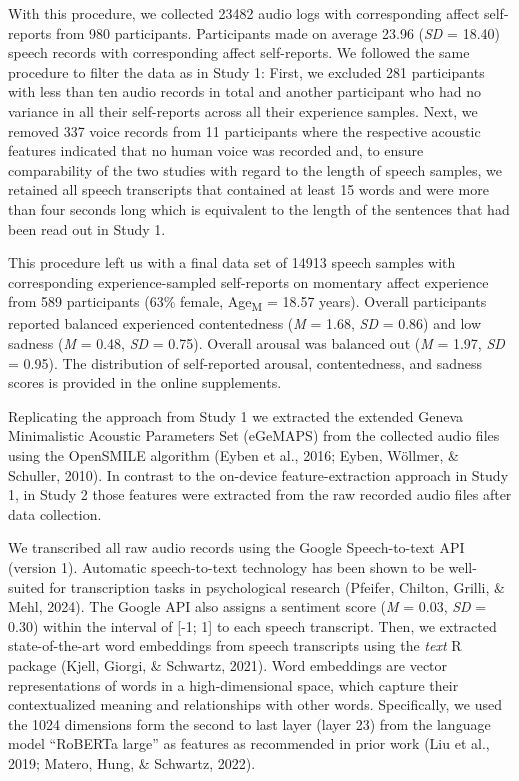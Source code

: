 \documentclass[
  english,
  man,floatsintext]{apa6}
\begin{document}
With this procedure, we collected 23482 audio logs with corresponding affect self-reports from 980 participants. Participants made on average 23.96 (\emph{SD} = 18.40) speech records with corresponding affect self-reports. We followed the same procedure to filter the data as in Study 1: First, we excluded 281 participants with less than ten audio records in total and another participant who had no variance in all their self-reports across all their experience samples. Next, we removed 337 voice records from 11 participants where the respective acoustic features indicated that no human voice was recorded and, to ensure comparability of the two studies with regard to the length of speech samples, we retained all speech transcripts that contained at least 15 words and were more than four seconds long which is equivalent to the length of the sentences that had been read out in Study 1.

This procedure left us with a final data set of 14913 speech samples with corresponding experience-sampled self-reports on momentary affect experience from 589 participants (63\% female, Age\textsubscript{M} = 18.57 years). Overall participants reported balanced experienced contentedness (\emph{M} = 1.68, \emph{SD} = 0.86) and low sadness (\emph{M} = 0.48, \emph{SD} = 0.75). Overall arousal was balanced out (\emph{M} = 1.97, \emph{SD} = 0.95). The distribution of self-reported arousal, contentedness, and sadness scores is provided in the online supplements.

Replicating the approach from Study 1 we extracted the extended Geneva Minimalistic Acoustic Parameters Set (eGeMAPS) from the collected audio files using the OpenSMILE algorithm (Eyben et al., 2016; Eyben, Wöllmer, \& Schuller, 2010). In contrast to the on-device feature-extraction approach in Study 1, in Study 2 those features were extracted from the raw recorded audio files after data collection.

We transcribed all raw audio records using the Google Speech-to-text API (version 1). Automatic speech-to-text technology has been shown to be well-suited for transcription tasks in psychological research (Pfeifer, Chilton, Grilli, \& Mehl, 2024). The Google API also assigns a sentiment score (\emph{M} = 0.03, \emph{SD} = 0.30) within the interval of {[}-1; 1{]} to each speech transcript. Then, we extracted state-of-the-art word embeddings from speech transcripts using the \emph{text} R package (Kjell, Giorgi, \& Schwartz, 2021). Word embeddings are vector representations of words in a high-dimensional space, which capture their contextualized meaning and relationships with other words. Specifically, we used the 1024 dimensions form the second to last layer (layer 23) from the language model ``RoBERTa large'' as features as recommended in prior work (Liu et al., 2019; Matero, Hung, \& Schwartz, 2022).
\end{document}

